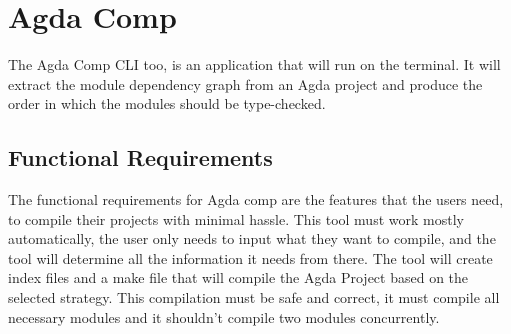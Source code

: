 \section{Agda Comp}

The Agda Comp CLI too, is an application that will run on the terminal. It will
extract the module dependency graph from an Agda project and produce the order
in which the modules should be type-checked.

\subsection{Functional Requirements}

\begin{minipage}{\linewidth}

The functional requirements for Agda comp are the features that the users
need, to compile their projects with minimal hassle. This tool must work
mostly automatically, the user only needs to input what they want to compile, and the tool will determine all the information it needs from there. The tool
will create index files and a make file that will compile the Agda Project
based on the selected strategy. This compilation must be safe and correct, it
must compile all necessary modules and it shouldn't compile two modules
concurrently.


\end{minipage}

